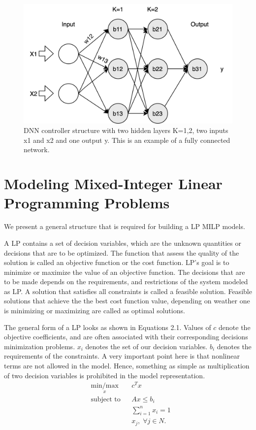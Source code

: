 \begin{figure}
	\centering
	\includegraphics[width=0.7\linewidth]{Images/DNNstructure}
	\caption[DNN structure]{DNN controller structure with two hidden layers K=1,2, two inputs x1 and x2 and one output y. This is an example of a fully connected network.}
	\label{fig:dnn-controller}
\end{figure}

\section{Modeling Mixed-Integer Linear Programming Problems}

We present a general structure that is required for building a \ac{LP} \ac{MILP} models. 

A \ac{LP} contains a set of decision variables, which are the unknown quantities or decisions that are to be optimized. 
The function that assess the quality of the solution is called an objective function or the cost function.
\ac{LP}'s goal is to minimize or maximize the value of an objective function. 
The decisions that are to be made depends on the requirements, and restrictions of the  system modeled as \ac{LP}.
A  solution that satisfies all constraints is called a feasible solution. 
Feasible solutions that achieve the the best cost function value, depending on weather one is minimizing or maximizing are called as optimal solutions. 

The general form of a \ac{LP} looks as shown in Equations 2.1. 
Values of $c$ denote the objective coefficients, and are often associated with their corresponding decisions minimization problems. 
$x_i$ denotes the set of our decision variables.
$b_i$ denotes the requirements of the constraints. 
A very important point here is that nonlinear terms are not allowed in the model. 
Hence, something as simple as multiplication of two decision variables is prohibited in the model representation. 
\begin{equation}
\begin{aligned}
& \underset{x}{\text{min/max}}
& & c^T x \\
& \text{subject to} & &  Ax \leq b_i \\
& & &  \sum_{i=1}^{n} x_i =1 \\
& & &  x_j, \; \forall j \in N. \\
\end{aligned}
\end{equation}

